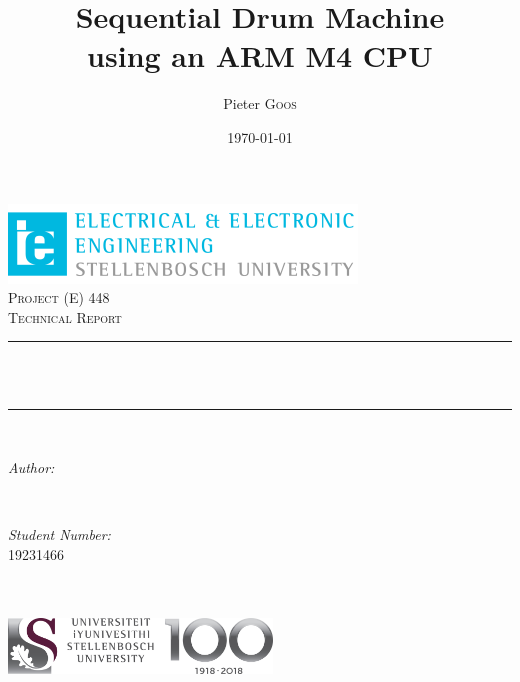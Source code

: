 \documentclass[11pt,a4paper]{article}
\title{Sequential Drum Machine \\using an ARM M4 CPU} %
\author{Pieter \textsc{Goos}} %
\date{\today} %
\makeatletter
\let\thetitle\@title
\let\theauthor\@author
\let\thedate\@date
\makeatother
\begin{document}
\begin{titlepage}
    \centering
    \vspace*{0.5 cm}
    \includegraphics[scale = 2]{EELogo.png}\\[1.0 cm]   %
    \textsc{\LARGE Project (E) 448 \\ Technical Report}\\[0.5 cm]               %
    \rule{\linewidth}{0.2 mm} \\[0.4 cm]
    { \huge \bfseries \thetitle }\\[0.4 cm]
    \rule{\linewidth}{0.2 mm} \\[1.5 cm]
    
	\begin{minipage}{6.5cm}
		\begin{flushleft} \large
			\emph{Author:}\\
			\theauthor
		\end{flushleft}
	\end{minipage}~
	\begin{minipage}{6.5cm}
		\begin{flushright} \large
			\emph{Student Number:} \\
			19231466
		\end{flushright}
	\end{minipage}\\[2 cm]
    
    {\large \thedate}\\[2 cm]
    \vfill
    \includegraphics[width=7cm]{SUNLogo.jpg}\\[1.0 cm]
\end{titlepage}
\end{document}
